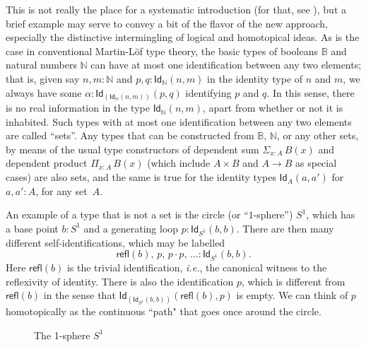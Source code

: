 \documentclass[11pt]{article}
\newcommand{\B}{\ensuremath{\mathbb{B}}}
\newcommand{\N}{\ensuremath{\mathbb{N}}}
\newcommand{\Id}{\mathsf{Id}}
\newcommand{\id}[1]{\Id_{#1}}
\newcommand{\refl}{\mathsf{refl}}
\theoremstyle{remark}
\theoremstyle{definition}
\begin{document}
This is not really the place for a systematic introduction (for that, see \cite{HoTTbook}), but a brief example may
serve to convey a bit of the flavor of the new approach, especially the distinctive intermingling of logical and
homotopical ideas.  As is the case in conventional Martin-L\"of type theory, the basic types of booleans $\B$ and
natural numbers $\N$ can have at most one identification between any two elements; that is, given say $n, m : \N$ and
$p,q: \id{\N}(n,m)$ in the identity type of $n$ and $m$, we always have some
$\alpha:\id{\left(\id{\N}(n,m)\right)}(p,q)$ identifying $p$ and $q$.  In this sense, there is no real information in
the type $\id{\N}(n,m)$, apart from whether or not it is inhabited.  Such types with at most one identification between
any two elements are called ``sets''.  Any types that can be constructed from $\B$, $\N$, or any other sets, by means of
the usual type constructors of dependent sum $\Sigma_{x:A}\,B(x)$ and dependent product $\Pi_{x:A}\,B(x)$ (which include
$A\times B$ and $A\rightarrow B$ as special cases) are also sets, and the same is true for the identity types
$\id{A}(a,a')$ for $a,a':A$, for any set~$A$.

An example of a type that is not a set is the circle (or ``$1$-sphere'') $S^1$, which has a base point $b: S^1$ and a
generating loop $ p :\id{S^1}(b,b)$.  There are then many different self-identifications, which may be labelled
$$\refl(b),\, p,\, p\cdot p,\, ... :\id{S^1}(b,b).$$ 
Here $\refl(b)$ is the trivial identification, \textit{i.e.}, the
canonical witness to the reflexivity of identity.  There is also the identification $p$, which is different from
$\refl(b)$ in the sense that $\id{\left(\id{S^1}(b,b)\right)}(\refl(b), p)$ is empty.  We can think of $p$ homotopically
as the continuous ``path" that goes once around the circle.

\begin{figure}\centering
\caption{The 1-sphere $S^1$}\label{fig:s1}
\end{figure}
\end{document}
